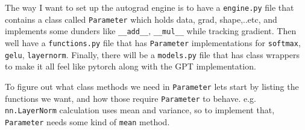\documentclass[11pt]{article}
\begin{document}
The way I want to set up the autograd engine is to have 
a \texttt{engine.py} file that contains a class called \texttt{Parameter} which holds data, grad, shape,..etc, and 
implements some dunders like \texttt{\_\_add\_\_}, \texttt{\_\_mul\_\_} while tracking gradient. Then well have a \texttt{functions.py}
file that has \texttt{Parameter} implementations for \texttt{softmax}, \texttt{gelu}, \texttt{layernorm}. Finally, there 
will be a \texttt{models.py} file that has class wrappers to make it all feel like pytorch along with the
GPT implementation. 
\par To figure out what class methods we need in \texttt{Parameter} lets start by listing the functions we want, and how 
those require \texttt{Parameter} to behave. e.g. \texttt{nn.LayerNorm} calculation uses 
mean and variance, so to implement that,
\texttt{Parameter} needs some kind of \texttt{mean} method.
\end{document}
